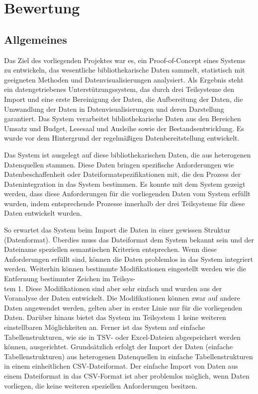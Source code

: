 \section{Bewertung}

\subsection{Allgemeines}
\label{chap:five_three_one}
Das Ziel des vorliegenden Projektes war es, ein Proof-of-Concept eines Systems zu entwickeln, 
das wesentliche bibliothekarische Daten sammelt, statistisch mit geeigneten Methoden und
Datenvisualisierungen analysiert. Als Ergebnis steht ein datengetriebenes 
Unterstützungssystem, das durch drei Teilsysteme den Import und eine erste Bereinigung der Daten,
die Aufbereitung der Daten, die Umwandlung der Daten in Datenvisualisierungen und deren Darstellung garantiert. 
Das System verarbeitet bibliothekarische Daten aus den Bereichen Umsatz und Budget, Lesesaal und Ausleihe 
sowie der Bestandsentwicklung. Es wurde vor dem Hintergrund der regelmäßigen Datenbereitstellung entwickelt.

Das System ist ausgelegt auf diese bibliothekarischen Daten, die aus heterogenen Datenquellen stammen.
Diese Daten bringen spezifische Anforderungen wie Datenbeschaffenheit oder Dateiformatspezifikationen mit, 
die den Prozess der Datenintegration in das System bestimmen. Es konnte mit dem System gezeigt werden, 
dass diese Anforderungen für die vorliegenden Daten vom System erfüllt wurden, indem entsprechende Prozesse innerhalb
der drei Teilsysteme für diese Daten entwickelt wurden.

So erwartet das System beim Import die Daten in einer gewissen Struktur (Datenformat). 
Überdies muss das Dateiformat dem System bekannt sein und der Dateiname speziellen semantischen 
Kriterien entsprechen. Wenn diese Anforderungen erfüllt sind, können die Daten problemlos in das System integriert werden.
Weiterhin können bestimmte Modifikationen eingestellt werden wie die Entfernung
bestimmter Zeichen im Teilsys-\\tem 1. Diese Modifikationen sind aber sehr einfach und wurden aus der Voranalyse
der Daten entwickelt. Die Modifikationen können zwar auf andere Daten angewendet werden, gelten aber in erster Linie nur für die vorliegenden Daten. 
Darüber hinaus bietet das System im Teilsystem 1 keine weiteren einstellbaren Möglichkeiten an. Ferner ist das System auf einfache 
Tabellenstrukturen, wie sie in TSV- oder Excel-Dateien abgespeichert werden können, ausgerichtet.
Grundsätzlich erfolgt der Import der Daten (einfache Tabellenstrukturen) aus heterogenen Datenquellen 
in einfache Tabellenstrukturen in einem einheitlichen CSV-Dateiformat. Der einfache Import von Daten aus einem Dateiformat 
in das CSV-Format ist aber problemlos möglich, wenn Daten vorliegen, die keine weiteren speziellen
Anforderungen besitzen.

